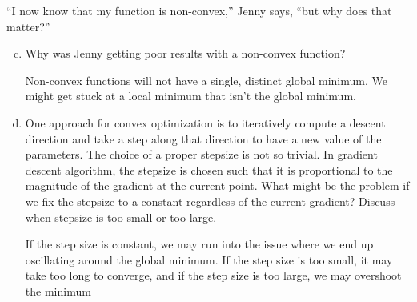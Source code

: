 \documentclass{article}
\begin{document}
``I now know that my function is non-convex,'' Jenny says, ``but why does that matter?''
\begin{enumerate}[(a)]
		\setcounter{enumi}{2}
	\item Why was Jenny getting poor results with a non-convex function?
		\begin{answer*}
			Non-convex functions will not have a single, distinct global minimum. We might get stuck at a local minimum that isn't the global minimum.
		\end{answer*}

	\item One approach for convex optimization is to iteratively compute a descent direction and take a step along that direction to have a new value of the parameters. The choice of a proper stepsize is not so trivial. In gradient descent algorithm, the stepsize is chosen such that it is proportional to the magnitude of the gradient at the current point. What might be the problem if we fix the stepsize to a constant regardless of the current gradient? Discuss when stepsize is too small or too large.
		\begin{answer*}
			If the step size is constant, we may run into the issue where we end up oscillating around the global minimum. If the step size is too small, it may take too long to converge, and if the step size is too large, we may overshoot the minimum
		\end{answer*}

\end{enumerate}
\end{document}
